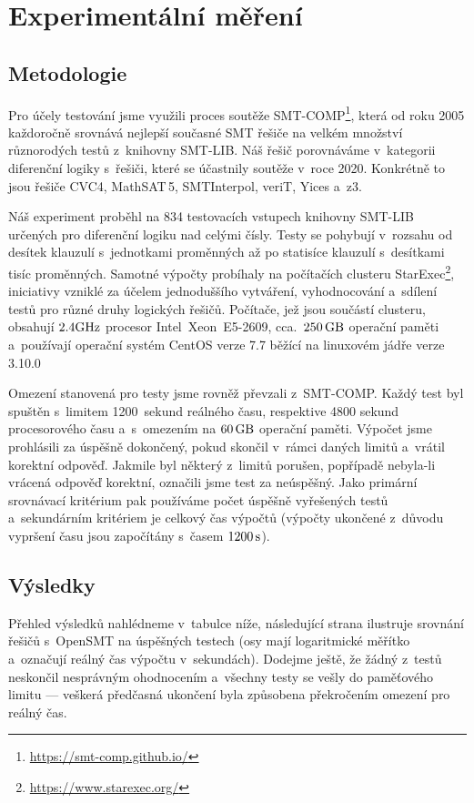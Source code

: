 \chapter{Experimentální měření}\label{experiment}

\section{Metodologie}

Pro účely testování jsme využili proces soutěže SMT-COMP\footnote{\url{https://smt-comp.github.io/}}, která od roku 2005 každoročně srovnává nejlepší současné SMT řešiče na velkém množství různorodých testů z~knihovny SMT-LIB. Náš řešič porovnáváme v~kategorii diferenční logiky s~řešiči, které se účastnily soutěže v~roce 2020. Konkrétně to jsou řešiče CVC4, MathSAT\,5, SMTInterpol, veriT, Yices a~z3.

Náš experiment proběhl na 834 testovacích vstupech knihovny SMT-LIB určených pro diferenční logiku nad celými čísly. Testy se pohybují v~rozsahu od desítek klauzulí s~jednotkami proměnných až po statisíce klauzulí s~desítkami tisíc proměnných. Samotné výpočty probíhaly na počítačích clusteru StarExec\footnote{\url{https://www.starexec.org/}}, iniciativy vzniklé za účelem jednoduššího vytváření, vyhodnocování a~sdílení testů pro různé druhy logických řešičů. Počítače, jež jsou součástí clusteru, obsahují $2.4\rm GHz$ procesor Intel\textregistered\ Xeon\textregistered\ E5-2609, cca.~$250\,\rm GB$ operační paměti a~používají operační systém CentOS verze 7.7 běžící na linuxovém jádře verze 3.10.0

Omezení stanovená pro testy jsme rovněž převzali z~SMT-COMP. Každý test byl spuštěn s~limitem 1200~sekund reálného času, respektive 4800 sekund procesorového času a~s~omezením na $60\,\rm GB$ operační paměti. Výpočet jsme prohlásili za úspěšně dokončený, pokud skončil v~rámci daných limitů a~vrátil korektní odpověď. Jakmile byl některý z~limitů porušen, popřípadě nebyla-li vrácená odpověď korektní, označili jsme test za neúspěšný. Jako primární srovnávací kritérium pak používáme počet úspěšně vyřešených testů a~sekundárním kritériem je celkový čas výpočtů (výpočty ukončené z~důvodu vypršení času jsou započítány s~časem $1200\,\rm s$).

\section{Výsledky}

Přehled výsledků nahlédneme v~tabulce níže, následující strana ilustruje srovnání řešičů s~OpenSMT na úspěšných testech (osy mají logaritmické měřítko a~označují reálný čas výpočtu v~sekundách). Dodejme ještě, že žádný z~testů neskončil nesprávným ohodnocením a~všechny testy se vešly do paměťového limitu --- veškerá předčasná ukončení byla způsobena překročením omezení pro reálný čas.


